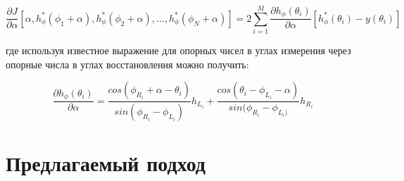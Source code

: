 \documentclass[a4paper,12pt, titlepage]{article}
\begin{document}
$$
\frac{\partial J}{\partial \alpha} [\alpha,
h_{\phi}^{*}(\phi_{1} + \alpha), h_{\phi}^{*}(\phi_{2} + \alpha), \ldots,
h_{\phi}^{*}(\phi_{N} + \alpha)] =
2 \sum \limits_{i = 1}^{M}  \frac{\partial h_{\phi}(\theta_{i}) }{\partial
\alpha} [h_{\phi}^{*}(\theta_{i}) - y(\theta_{i})]
$$

где используя известное выражение для опорных чисел в углах измерения через
опорные числа в углах восстановления можно получить:

$$
\frac{\partial h_{\phi}(\theta_{i})}{\partial \alpha} =
\frac{cos(\phi_{R_{i}} + \alpha - \theta_{i})}{sin(\phi_{R_{i}} - \phi_{L_{i}})}
h_{L_{i}} +
\frac{cos(\theta_{i} - \phi_{L_{i}} - \alpha)}{sin(\phi_{R_{i}} - \phi_{L_{i})}}
h_{R_{i}}
$$

\newpage
\section{Предлагаемый подход}

\newpage


\end{document}
